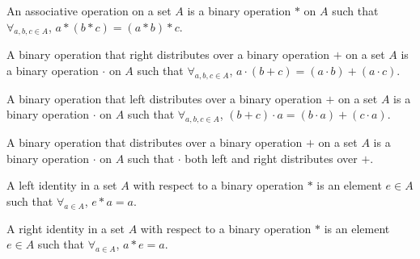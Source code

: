             \begin{definition}
                \label{%
                    Definition:MathEnc:Analysis:%
                        Sum:AssociativeOperation%
                }
                An associative operation on a set $A$ is a
                binary operation $*$ on $A$
                such that $\forall_{a,b,c\in A}$, $a*(b*c)=(a*b)*c$.
            \end{definition}
            \begin{definition}
                \label{%
                    Definition:MathEnc:Analysis:%
                    Sum:RightDistribute%
                }
                A binary operation that right distributes
                over a binary operation $+$ on
                a set $A$ is a binary operation $\cdot$ on $A$
                such that $\forall_{a,b,c\in A}$,
                $a\cdot (b+c)=(a\cdot b)+(a\cdot c)$.
            \end{definition}
            \begin{definition}
                \label{%
                    Definition:MathEnc:Analysis:%
                    Sum:LeftDistribute%
                }
                A binary operation that left distributes
                over a binary operation $+$ on
                a set $A$ is a binary operation $\cdot$ on $A$
                such that $\forall_{a,b,c\in A}$,
                $(b+c)\cdot a=(b\cdot a)+(c\cdot a)$.
            \end{definition}
            \begin{definition}
                \label{Definition:MathEnc:Analysis:Sum:Distribute}
                A binary operation that distributes over a binary
                operation $+$ on a set $A$ is a binary operation
                $\cdot$ on $A$ such that $\cdot$ both left and right
                distributes over $+$.
            \end{definition}
            \begin{definition}
                \label{Definition:MathEnc:Analysis:Sum:LeftIdentity}
                A left identity in a set $A$ with respect
                to a binary operation $*$ is
                an element $e\in A$ such that $\forall_{a\in A}$,
                $e*a=a$.
            \end{definition}
            \begin{definition}
                \label{Definition:MathEnc:Analysis:Sum:RightIdentity}
                A right identity in a set $A$ with respect to a
                binary operation $*$ is an element $e\in A$
                such that $\forall_{a\in A}$, $a*e=a$.
            \end{definition}
